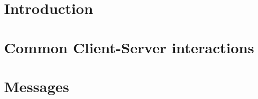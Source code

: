 \documentclass[twoside,a4paper]{refart}
\title{\thetitle}
\author{
        Vijay Bajracharya   \\
        Nick Hayes\\
        Rohun Kaddu\\
        Mateo Lopez \\
        Carson Storm \\
        Adian Taylor
}
\date{}
\begin{document}
\maketitle

\begin{abstract}
        
\end{abstract}

\tableofcontents

\newpage


\section{Introduction}



\section{Common Client-Server interactions}


\section{Messages}


\end{document}
